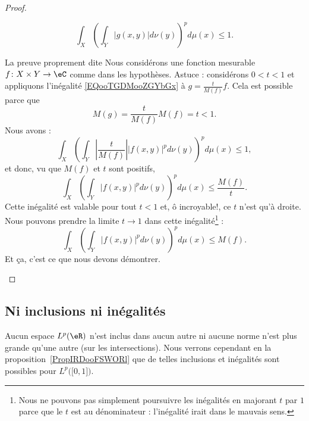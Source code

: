 \begin{proof}
\begin{subproof}
\begin{equation}
            \int_X\left( \int_Y| g(x,y) |d\nu(y) \right)^pd\mu(x)\leq 1.
        \end{equation}
    \item[La preuve proprement dite]
        Nous considérons une fonction mesurable \( f\colon X\times Y\to \eC\) comme dans les hypothèses. Astuce : considérons \( 0<t<1\) et appliquons l'inégalité \eqref{EQooTGDMooZGYbGx} à \( g=\frac{ t }{ M(f) }f\). Cela est possible parce que
        \begin{equation}
            M(g)=\frac{ t }{ M(f) }M(f)=t<1.
        \end{equation}
        Nous avons :
        \begin{equation}
            \int_X\left( \int_Y| \frac{ t }{ M(f) } | |f(x,y) |^pd\nu(y) \right)^pd\mu(x)\leq 1,
        \end{equation}
        et donc, vu que \( M(f)\) et \( t\) sont positifs,
        \begin{equation}
            \int_X\left( \int_Y| f(x,y) |^pd\nu(y) \right)^pd\mu(x)\leq \frac{ M(f) }{ t }.
        \end{equation}
        Cette inégalité est valable pour tout \( t<1\) et, ô incroyable!, ce \( t\) n'est qu'à droite. Nous pouvons prendre la limite \( t\to 1\) dans cette inégalité\footnote{Nous ne pouvons pas simplement poursuivre les inégalités en majorant $ t$ par $ 1$ parce que le $ t$ est au dénominateur : l'inégalité irait dans le mauvais sens.}  :
        \begin{equation}
            \int_X\left( \int_Y| f(x,y) |^pd\nu(y) \right)^pd\mu(x)\leq M(f).
        \end{equation}
        Et ça, c'est ce que nous devons démontrer.
    \end{subproof}
    
\end{proof}


\subsection{Ni inclusions ni inégalités}

Aucun espace \( L^p(\eR)\) n'est inclus dans aucun autre ni aucune norme n'est plus grande qu'une autre (sur les intersections). Nous verrons cependant en la proposition~\ref{PropIRDooFSWORl} que de telles inclusions et inégalités sont possibles pour \( L^p\big( \mathopen[ 0 , 1 \mathclose] \big)\).

